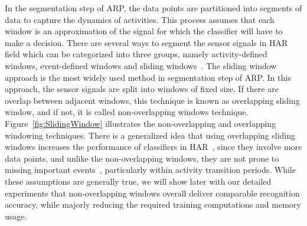 \documentclass[sensors,article,submit,moreauthors,pdftex]{Definitions/mdpi}
\begin{document}
In the segmentation step of ARP, the data points are partitioned into segments of data to capture the dynamics of activities. This process assumes that each 
window is an approximation of the signal for which the classifier will 
have to make a decision. There are several ways to segment the sensor signals in HAR field which can be categorized into three groups, namely activity-defined windows, event-defined windows and sliding windows~\cite{banos2014window}. The sliding window approach is the most widely used method in segmentation step of ARP. In this approach, the sensor signals are split into windows of fixed size. If there are overlap between adjacent windows, this technique is known as overlapping sliding window, and if not, it is called non-overlapping windows technique. 
Figure~\ref{fig:SlidingWindow} illustrates the 
non-overlapping and overlapping windowing techniques.
There is a generalized idea that using overlapping sliding windows increases the performance of classifiers in HAR~\cite{janidarmian2014automated}, since they involve more data points, and unlike the non-overlapping windows, they are not prone to missing important events~\cite{coggeshall2005asset}, particularly within activity transition periods. While these assumptions are generally true, we will show later with our detailed experiments that non-overlapping windows overall deliver comparable recognition accuracy, while majorly reducing the required training computations and memory usage.
\end{document}
